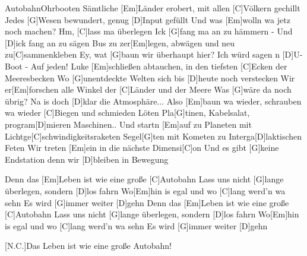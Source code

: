 \documentclass[../main.tex]{subfiles}
\begin{document}
\begin{song}{Autobahn}{Ohrbooten}{}
Sämtliche [Em]Länder erobert, mit allen [C]Völkern gechillt
Jedes [G]Wesen bewundert, genug [D]Input gefüllt
Und was [Em]wolln wa jetz noch machen?
Hm, [C]lass ma überlegen
Ick [G]fang ma an zu hämmern - Und [D]ick fang an zu sägen
Bus zu zer[Em]legen, abwägen und neu zu[C]sammenkleben
Ey, wat [G]baun wir überhaupt hier?
Ich würd sagen n [D]U-Boot - Auf jeden!
Luke [Em]schließen abtauchen, in den tiefsten [C]Ecken der Meeresbecken
Wo [G]unentdeckte Welten sich bis [D]heute noch verstecken
Wir er[Em]forschen alle Winkel der [C]Länder und der Meere
Was [G]wäre da noch übrig? Na is doch [D]klar die Atmosphäre...
Also [Em]baun wa wieder, schrauben wa wieder
[C]Biegen und schmieden
Löten Pla[G]tinen, Kabelsalat, program[D]mieren Maschinen..
Und startn [Em]auf zu Planeten mit Lichtge[C]schwindigkeitsraketen
Segel[G]ten mit Kometen zu Interga[D]laktischen Feten
Wir treten [Em]ein in die nächste Dimensi[C]on
Und es gibt [G]keine Endstation denn wir [D]bleiben in Bewegung

Denn das [Em]Leben ist wie eine große [C]Autobahn
Lass uns nicht [G]lange überlegen, sondern [D]los fahrn
Wo[Em]hin is egal und wo [C]lang werd'n wa sehn
Es wird [G]immer weiter [D]gehn
Denn das [Em]Leben ist wie eine große [C]Autobahn
Lass uns nicht [G]lange überlegen, sondern [D]los fahrn
Wo[Em]hin is egal und wo [C]lang werd'n wa sehn
Es wird [G]immer weiter [D]gehn

[N.C.]Das Leben ist wie eine große Autobahn!


\end{song}
\end{document}
